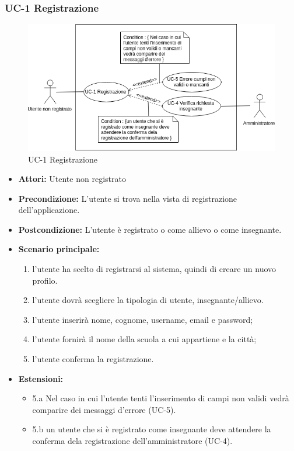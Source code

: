 \subsubsection{UC-1 Registrazione}
		\begin{figure}[h]
			\centering
			\includegraphics[scale=0.7]{images/UC-1.png}
			\caption{UC-1 Registrazione}
		\end{figure}			
\begin{itemize}
		\item \textbf{Attori: }Utente non registrato
		\item \textbf{Precondizione: }L'utente si trova nella vista di registrazione dell'applicazione.
		\item \textbf{Postcondizione: }L'utente è registrato o come allievo o come insegnante.
		\item \textbf{Scenario principale: }
		\begin{enumerate}
		\item l'utente ha scelto di registrarsi al sistema, quindi di creare un nuovo profilo. 
		\item l'utente dovrà scegliere la tipologia di utente, insegnante/allievo. 
		\item l'utente inserirà nome, cognome, username, email e password;
		\item l'utente fornirà il nome della scuola a cui appartiene e la città; 
		\item l'utente conferma la registrazione.
		\end{enumerate}
		\item \textbf{Estensioni: }
		\begin{itemize}
			\item 5.a Nel caso in cui l'utente tenti l'inserimento di campi non validi vedrà comparire dei messaggi d'errore (UC-5).
			\item 5.b un utente che si è registrato come insegnante deve attendere la conferma dela registrazione dell'amministratore (UC-4).
		\end{itemize}
	\end{itemize}
